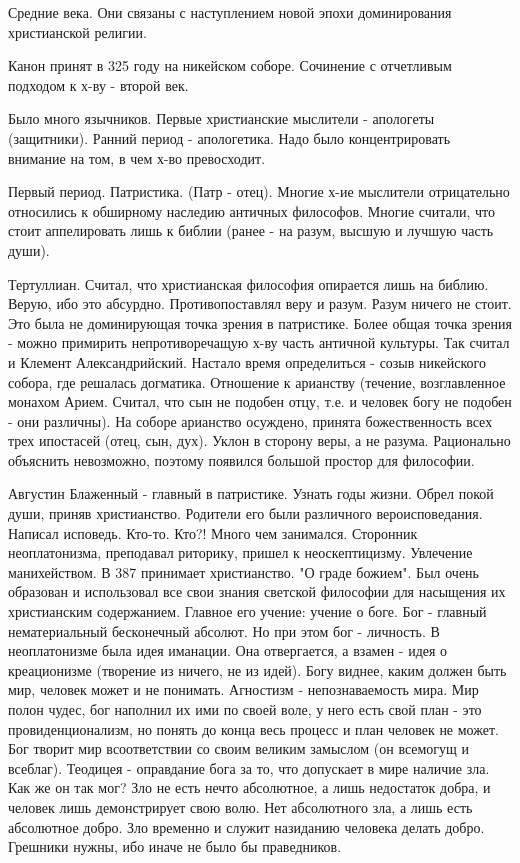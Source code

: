 Средние века.
Они связаны с наступлением новой эпохи доминирования христианской религии.

Канон принят в 325 году на никейском соборе. Сочинение с отчетливым подходом к х-ву - второй век.

Было много язычников. Первые христианские мыслители - апологеты (защитники). Ранний период - апологетика. Надо было концентрировать внимание на том, в чем х-во превосходит.

Первый период. Патристика. (Патр - отец). Многие х-ие мыслители отрицательно относились к обширному наследию античных философов. Многие считали, что стоит аппелировать лишь к библии (ранее - на разум, высшую и лучшую часть души).

Тертуллиан. Считал, что христианская философия опирается лишь на библию. Верую, ибо это абсурдно. Противопоставлял веру и разум. Разум ничего не стоит.
Это была не доминирующая точка зрения в патристике. Более общая точка зрения - можно примирить непротиворечащую х-ву часть античной культуры. Так считал и Клемент Александрийский.
Настало время определиться - созыв никейского собора, где решалась догматика. Отношение к арианству (течение, возглавленное монахом Арием. Считал, что сын не подобен отцу, т.е. и человек богу не подобен - они различны). На соборе арианство осуждено, принята божественность всех трех ипостасей (отец, сын, дух). Уклон в сторону веры, а не разума. Рационально объяснить невозможно, поэтому появился большой простор для философии.

Августин Блаженный - главный в патристике. Узнать годы жизни.
Обрел покой души, приняв христианство. Родители его были различного вероисповедания. Написал исповедь.
Кто-то. Кто?!
Много чем занимался. Сторонник неоплатонизма, преподавал риторику, пришел к неоскептицизму. Увлечение манихейством. В 387 принимает христианство. "О граде божием". Был очень образован и использовал все свои знания светской философии для насыщения их христианским содержанием. Главное его учение: учение о боге. Бог - главный нематериальный бесконечный абсолют. Но при этом бог - личность. В неоплатонизме была идея иманации. Она отвергается, а взамен - идея о креационизме (творение из ничего, не из идей). Богу виднее, каким должен быть мир, человек может и не понимать. Агностизм - непознаваемость мира. Мир полон чудес, бог наполнил их ими по своей воле, у него есть свой план - это провиденционализм, но понять до конца весь процесс и план человек не может. Бог творит мир всоответствии со своим великим замыслом (он всемогущ и всеблаг). Теодицея - оправдание бога за то, что допускает в мире наличие зла. Как же он так мог? Зло не есть нечто абсолютное, а лишь недостаток добра, и человек лишь демонстрирует свою волю. Нет абсолютного зла, а лишь есть абсолютное добро. Зло временно и служит назиданию человека делать добро. Грешники нужны, ибо иначе не было бы праведников.

